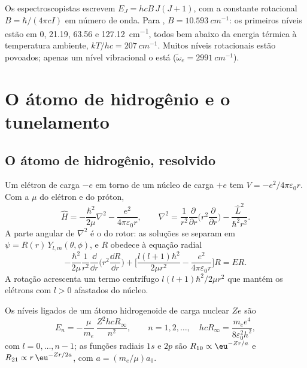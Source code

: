 \begin{example}\label{ex:b3:quantum-model-systems:hcl}
Os espectroscopistas escrevem $E_J = hcB\,J(J+1)$, com a constante rotacional $B =
\hbar/(4\pi cI)$ em número de onda. Para , $B = \qty{10.593}{cm^{-1}}$:
os primeiros níveis estão em 0, 21.19, 63.56 e \qty{127.12}{cm^{-1}}, todos bem
abaixo da energia térmica à temperatura ambiente, $kT/hc = \qty{207}{cm^{-1}}$.
Muitos níveis rotacionais estão povoados; apenas um nível vibracional o está
($\tilde\omega_e = \qty{2991}{cm^{-1}}$).
\end{example}

\section{O átomo de hidrogênio e o tunelamento}

\subsection*{O átomo de hidrogênio, resolvido}

Um elétron de carga $-e$ em torno de um núcleo de carga $+e$ tem $V = -e^2/
4\pi\varepsilon_0r$. Com a  $\mu$ do elétron e do próton,
\[
\hat H = -\frac{\hbar^2}{2\mu}\nabla^2 - \frac{e^2}{4\pi\varepsilon_0r},\qquad
\nabla^2 = \frac{1}{r^2}\frac{\partial}{\partial r}\Big(r^2\frac{\partial}{
\partial r}\Big) - \frac{\hat L^2}{\hbar^2r^2}.
\]
A parte angular de $\nabla^2$ é o  do rotor: as soluções
se separam em $\psi = R(r)\,Y_{l,m}(\theta,\phi)$, e $R$ obedece à equação
radial
\[
-\frac{\hbar^2}{2\mu}\frac{1}{r^2}\frac{\dd}{\dd r}\Big(r^2\frac{\dd R}{\dd r}
\Big) + \Big[\frac{l(l+1)\hbar^2}{2\mu r^2} - \frac{e^2}{4\pi\varepsilon_0r}
\Big]R = ER.
\]
A rotação acrescenta um termo centrífugo $l(l+1)\hbar^2/2\mu r^2$ que mantém
os elétrons com $l > 0$ afastados do núcleo.

\begin{theorem}\label{thm:b3:quantum-model-systems:hydrogen}
Os níveis ligados de um átomo hidrogenoide de carga nuclear $Ze$ são
\[
E_n = -\frac{\mu}{m_e}\,\frac{Z^2hcR_\infty}{n^2}, \qquad n = 1, 2, \dots,
\quad hcR_\infty = \frac{m_ee^4}{8\varepsilon_0^2h^2},
\]
com $l = 0, \dots, n - 1$; as funções radiais $1s$ e $2p$ são $R_{10}
\propto \eu^{-Zr/a}$ e $R_{21} \propto r\,\eu^{-Zr/2a}$, com $a =
(m_e/\mu)a_0$.
\end{theorem}

